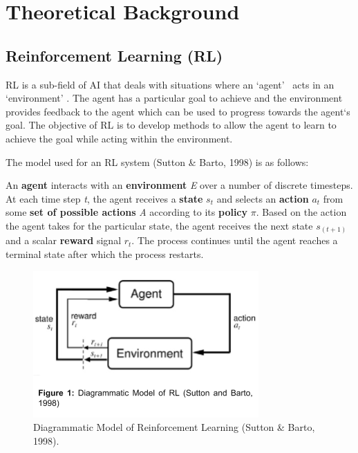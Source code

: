 \section{Theoretical Background}

\subsection*{Reinforcement Learning (RL)}
RL is a sub-field of AI that deals with situations where an `agent' \ acts in an `environment' . The agent has a particular goal to achieve and the environment provides feedback to the agent which can be used to progress towards the agent`s goal. The objective of RL is to develop methods to allow the agent to learn to achieve the goal while acting within the environment. 

The model used for an RL system (Sutton \& Barto, 1998) is as follows: 

An \textbf{agent} interacts with an \textbf{environment} \textit{E} over a number of discrete timesteps. At each time step \textit{t}, the agent receives a \textbf{state} $s_{t}$ and selects an \textbf{action} $a_{t}$ from some\textbf{ set of possible actions} \textit{A} according to its \textbf{policy} $\pi$. Based on the action the agent takes for the particular state, the agent receives the next state $s_{(t+1)}$ and a scalar \textbf{reward} signal $r_{t}$. The process continues until the agent reaches a terminal state after which the process restarts. 

 
\begin{figure}[t]
\includegraphics[width=\columnwidth]{fig1.png} 
\caption{Diagrammatic Model of Reinforcement Learning (Sutton \& Barto, 1998).}
\end{figure}	

